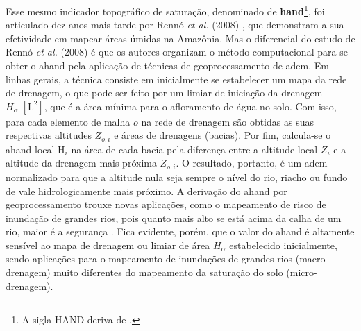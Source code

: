 \documentclass[./main.tex]{subfiles}
\begin{document}
\par Esse mesmo indicador topográfico de saturação, denominado de \textbf{\gls{hand}}\footnote{A sigla HAND deriva de .}, foi articulado dez anos mais tarde por Rennó \textit{et al.} (2008) \cite{Renno2008a}, que demonstram a sua efetividade em mapear áreas úmidas na Amazônia. Mas o diferencial do estudo de Rennó \textit{et al.} (2008) é que os autores organizam o método computacional para se obter o \acrshort{ahand} pela aplicação de técnicas de geoprocessamento de \acrshort{adem}. Em linhas gerais, a técnica consiste em inicialmente se estabelecer um mapa da rede de drenagem, o que pode ser feito por um limiar de iniciação da drenagem $H_{\alpha}\;[\text{L}^2]$, que é a área mínima para o afloramento de água no solo. Com isso, para cada elemento de malha $o$ na rede de drenagem são obtidas as suas respectivas altitudes $Z_{o, i}$ e áreas de drenagens (bacias). Por fim, calcula-se o \acrshort{ahand} local $\text{H}_i$ na área de cada bacia pela diferença entre a altitude local $Z_{i}$ e a altitude da drenagem mais próxima $Z_{o, i}$. O resultado, portanto, é um \acrlong{adem} normalizado para que a altitude nula seja sempre o nível do rio, riacho ou fundo de vale hidrologicamente mais próximo. A derivação do \acrshort{ahand} por geoprocessamento trouxe novas aplicações, como o mapeamento de risco de inundação de grandes rios, pois quanto mais alto se está acima da calha de um rio, maior é a segurança \cite{Nobre2016a}. Fica evidente, porém, que o valor do \acrshort{ahand} é altamente sensível ao mapa de drenagem ou limiar de área $H_{\alpha}$ estabelecido inicialmente, sendo aplicações para o mapeamento de inundações de grandes rios (macro-drenagem) muito diferentes do mapeamento da saturação do solo (micro-drenagem).
\end{document}
